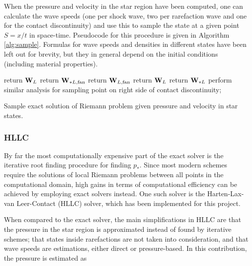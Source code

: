 \documentclass[final,3p,twocolumn,times]{elsarticle}
\begin{document}
When the pressure and velocity in the star region have been computed, one can
calculate the wave speeds (one per shock wave, two per rarefaction wave and one
for the contact discontinuity) and use this to sample the state at a given
point $S = x/t$ in space-time. Pseudocode for this procedure is given in
Algorithm \ref{alg:sample}. Formulas for wave speeds and densities in different
states have been left out for brevity, but they in general depend on the
initial conditions (including material properties).

\begin{algorithm}[htb]
    {
        {
            {
                return ${\bf W}_L$\;
            }
            {
                {
                    return ${\bf W}_{*L, {\rm fan}}$\;
                }
                {
                    return ${\bf W}_{L, {\rm fan}}$\;
                }
            }
        }
        {
            {
                return ${\bf W}_L$\;
            }
            {
                return ${\bf W}_{*L}$\;
            }
        }
    }
    {
        perform similar analysis for sampling point on right side of contact
        discontinuity; 
    }
    \caption{Sample exact solution of Riemann problem given pressure and
    velocity in star states.}
    \label{alg:sample}
\end{algorithm}

\subsubsection{HLLC}
\label{subsubsec:hllc}

By far the most computationally expensive part of the exact solver is the
iterative root finding procedure for finding $p_*$. Since most modern schemes
require the solutions of local Riemann problems between all points in the
computational domain, high gains in terms of computational efficiency can be
achieved by employing exact solvers instead. One such solver is the
Harten-Lax-van Leer-Contact (HLLC) solver, which has been implemented for this
project. 

When compared to the exact solver, the main simplifications in HLLC are that
the pressure in the star region is approximated instead of found by iterative
schemes; that states inside rarefactions are not taken into consideration, and 
that wave speeds are estimations, either direct or pressure-based. In this
contribution, the pressure is estimated as 
\end{document}
